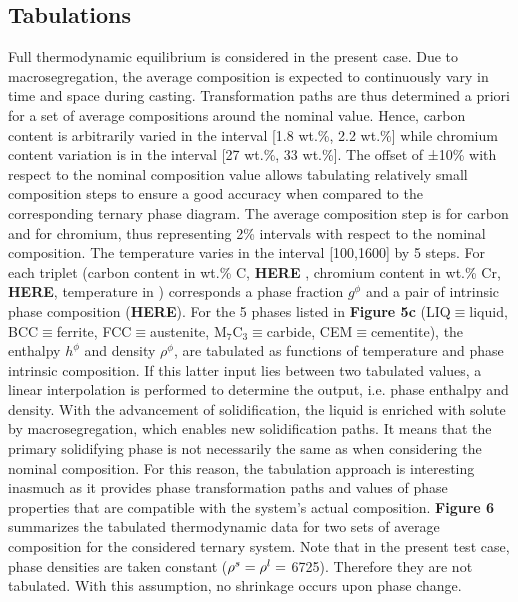 \subsection{Tabulations}
Full thermodynamic equilibrium is considered in the present case. Due to macrosegregation, 
the average composition is expected to continuously vary in time and space during casting. 
Transformation paths are thus determined a priori for a set of average compositions around 
the nominal value. Hence, carbon content is arbitrarily varied in the interval [1.8 wt.\%, 2.2 wt.\%] 
while chromium content variation is in the interval [27 wt.\%, 33 wt.\%]. The offset of ±10\% with 
respect to the nominal composition value allows tabulating relatively small composition steps to 
ensure a good accuracy when compared to the corresponding ternary phase diagram. The average 
composition step is  for carbon and  for chromium, thus representing 2\% 
intervals with respect to the nominal composition. The temperature varies in the interval 
[\SI{100}{\udegC},\SI{1600}{\udegC}] by \SI{5}{\udegC} steps. For each triplet (carbon content 
in wt.\% C, \textbf{HERE} , chromium content in wt.\% Cr, \textbf{HERE}, temperature in \si{\udegK}) 
corresponds a phase fraction $g^\phi$ and a pair of intrinsic phase composition (\textbf{HERE}). For the 5 
phases listed in \textbf{Figure 5c} (LIQ$\equiv$liquid, BCC$\equiv$ferrite, FCC$\equiv$austenite, 
$\text{M}_7 \text{C}_3 \equiv$carbide, CEM$\equiv$cementite), the enthalpy $h^\phi$ and density $\rho^\phi$, are tabulated 
as functions of temperature and phase intrinsic composition. If this latter input lies between two tabulated 
values, a linear interpolation is performed to determine the output, i.e. phase enthalpy and density. With 
the advancement of solidification, the liquid is enriched with solute by macrosegregation, which enables new 
solidification paths. It means that the primary solidifying phase is not necessarily the same as when considering 
the nominal composition. For this reason, the tabulation approach is interesting inasmuch as it provides phase 
transformation paths and values of phase properties that are compatible with the system’s actual composition. 
\textbf{Figure 6} summarizes the tabulated thermodynamic data for two sets of average composition for the considered 
ternary system. Note that in the present test case, phase densities are taken constant ($\rho^s=\rho^l=$ \SI{6725}{\udensity}). 
Therefore they are not tabulated. With this assumption, no shrinkage occurs upon phase change.
